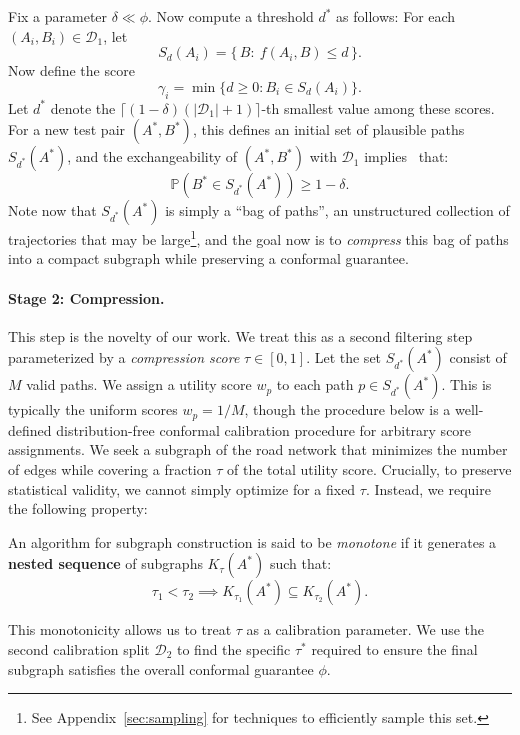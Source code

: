 Fix a parameter $\delta \ll \phi$. Now compute a threshold $d^*$ as follows: For each $(A_i, B_i) \in \mathcal{D}_1$, let 
\[
  S_{d}(A_i) = \{\,B:\ f(A_i,B)\le d\,\}.
\]
Now define the score
$$ \gamma_i = \min \{ d  \ge 0: B_i \in S_d(A_i) \}.$$
Let $d^*$ denote the $\lceil (1-\delta) (|\mathcal{D}_1|+1) \rceil$-th smallest value among these scores. For a new test pair $(A^*,B^*)$, this defines an initial set of plausible paths $S_{d^*}(A^*)$, and the exchangeability of $(A^*,B^*)$ with $\mathcal{D}_1$ implies~\cite{angelopoulos2021gentle,vovk2005algorithmic} that:
$$ \mathbb{P}(B^* \in S_{d^*}(A^*)) \ge 1-\delta.$$
Note now that $S_{d^*}(A^*)$ is simply a ``bag of paths'', an unstructured collection of trajectories that may be large\footnote{See Appendix~\ref{sec:sampling} for techniques to efficiently sample this set.}, and the goal now is to \emph{compress} this bag of paths into a compact subgraph while preserving a conformal guarantee.  

\paragraph{Stage 2: Compression.} This step is the novelty of our work. We treat this as a second filtering step parameterized by a \emph{compression score} $\tau \in [0,1]$. Let the set $S_{d^*}(A^*)$ consist of $M$ valid paths. We assign a utility score $w_p$ to each path $p \in S_{d^*}(A^*)$. This is typically the uniform scores $w_p = 1/M$, though the procedure below is a well-defined distribution-free conformal calibration procedure for arbitrary score assignments. We seek a subgraph of the road network that minimizes the number of edges while covering a fraction $\tau$ of the total utility score. Crucially, to preserve statistical validity, we cannot simply optimize for a fixed $\tau$. Instead, we require the following property:

\begin{definition}[Monotonicity]
\label{def:monotone}
An algorithm for subgraph construction is said to be \emph{monotone} if it generates a \textbf{nested sequence} of subgraphs $K_\tau(A^*)$ such that:
\[ \tau_1 < \tau_2 \implies K_{\tau_1}(A^*) \subseteq K_{\tau_2}(A^*). \]
\end{definition}

This monotonicity allows us to treat $\tau$ as a calibration parameter. We use the second calibration split $\mathcal{D}_2$ to find the specific $\tau^*$ required to ensure the final subgraph satisfies the overall conformal guarantee $\phi$.


